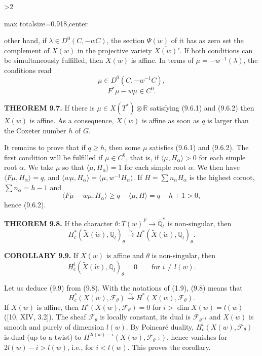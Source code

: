 \documentclass[9pt,twoside]{extarticle}
\newcommand{\EditionPage}[3]{%
  \ifnum#1>2\clearpage\fi
  \pdfbookmark[1]{Printed page #2}{en-folio-#2}%
  \hypertarget{en-physical-#1}{}%
  \noindent\begin{adjustbox}{max totalsize={\textwidth}{0.918\textheight},center}
  \begin{minipage}[t]{\textwidth}
  \fontsize{9.4}{11.1}\selectfont\justifying
  #3
  \end{minipage}
  \end{adjustbox}%
}
\begin{document}
\EditionPage{49}{150}{%
other hand, if \(\lambda\in D^0(C,-wC)\), the section \(\Psi(\dot w)\) of it has as zero set the complement of \(X(w)\) in the projective variety \(\overline{X(w)}'\). If both conditions can be simultaneously fulfilled, then \(X(w)\) is affine. In terms of \(\mu=-w^{-1}(\lambda)\), the conditions read \[
\tag{9.6.1}
\mu\in D^0(C,-w^{-1}C),
\]  \[
\tag{9.6.2}
F^*\mu-w\mu\in C^0.
\]\par

\noindent\textbf{THEOREM 9.7.} If there is \(\mu\in X(T^*)\otimes\mathbb R\) satisfying (9.6.1) and (9.6.2) then \(X(w)\) is affine. As a consequence, \(X(w)\) is affine as soon as \(q\) is larger than the Coxeter number \(h\) of \(G\).\par

It remains to prove that if \(q\ge h\), then some \(\mu\) satisfies (9.6.1) and (9.6.2). The first condition will be fulfilled if \(\mu\in C^0\), that is, if \(\langle\mu,H_\alpha\rangle>0\) for each simple root \(\alpha\). We take \(\mu\) so that \(\langle\mu,H_\alpha\rangle=1\) for each simple root \(\alpha\). We then have \(\langle F\mu,H_\alpha\rangle=q\), and \(\langle w\mu,H_\alpha\rangle=\langle\mu,w^{-1}H_\alpha\rangle\). If \(H=\sum n_\alpha H_\alpha\) is the highest coroot, \(\sum n_\alpha=h-1\) and \[
\langle F\mu-w\mu,H_\alpha\rangle
\ge q-\langle\mu,H\rangle
=q-h+1>0,
\] hence (9.6.2).\par

\noindent\textbf{THEOREM 9.8.} If the character \(\theta:T(w)^F\to\overline{\mathbb Q}_l^*\) is non-singular, then \[
H_c^*(\widetilde X(\dot w),\overline{\mathbb Q}_l)_\theta
\xrightarrow{\sim}
H^*(\widetilde X(\dot w),\overline{\mathbb Q}_l)_\theta.
\]\par

\noindent\textbf{COROLLARY 9.9.} If \(X(w)\) is affine and \(\theta\) is non-singular, then \[
H_c^i(\widetilde X(\dot w),\overline{\mathbb Q}_l)_\theta=0
\qquad\text{for }i\ne l(w).
\]\par

Let us deduce (9.9) from (9.8). With the notations of (1.9), (9.8) means that \[
\tag{9.9.1}
H_c^*(X(w),\mathcal F_\theta)
\xrightarrow{\sim}
H^*(X(w),\mathcal F_\theta).
\] If \(X(w)\) is affine, then \(H^i(X(w),\mathcal F_\theta)=0\) for \(i>\dim X(w)=l(w)\) ([10, XIV, 3.2]). The sheaf \(\mathcal F_\theta\) is locally constant, its dual is \(\mathcal F_{\theta^{-1}}\) and \(X(w)\) is smooth and purely of dimension \(l(w)\). By Poincaré duality, \(H_c^i(X(w),\mathcal F_\theta)\) is dual (up to a twist) to \(H^{2l(w)-i}(X(w),\mathcal F_{\theta^{-1}})\), hence vanishes for \(2l(w)-i>l(w)\), i.e., for \(i<l(w)\). This proves the corollary.\par

}
\end{document}
